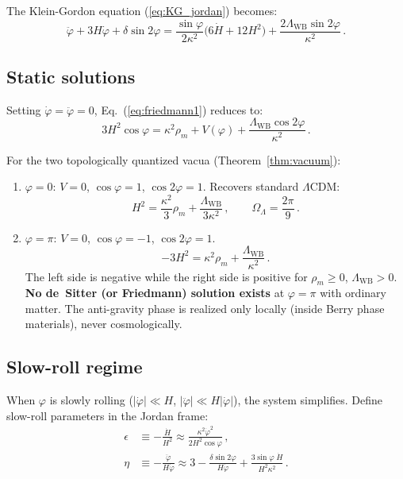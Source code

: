 \documentclass[aps,prd,twocolumn,superscriptaddress,nofootinbib]{revtex4-2}
\newcommand{\Lw}{\Lambda_{\mathrm{WB}}}
\begin{document}
The Klein-Gordon equation (\ref{eq:KG_jordan}) becomes:
\begin{equation}
  \ddot\varphi + 3H\dot\varphi + \delta\sin 2\varphi
  = \frac{\sin\varphi}{2\kappa^2}
  \bigl(6\dot{H} + 12H^2\bigr)
  + \frac{2\Lw\sin 2\varphi}{\kappa^2}\,.
  \label{eq:KG_cosmo}
\end{equation}

\subsection{Static solutions}

Setting $\dot\varphi = \ddot\varphi = 0$,
Eq.~(\ref{eq:friedmann1}) reduces to:
\begin{equation}
  3H^2\cos\varphi = \kappa^2\rho_m + V(\varphi)
  + \frac{\Lw\cos 2\varphi}{\kappa^2}\,.
\end{equation}

For the two topologically quantized vacua
(Theorem~\ref{thm:vacuum}):
\begin{enumerate}
\item $\varphi = 0$:
  $V = 0$, $\cos\varphi = 1$, $\cos 2\varphi = 1$.
  Recovers standard $\Lambda$CDM:
  \begin{equation}
    H^2 = \frac{\kappa^2}{3}\rho_m + \frac{\Lw}{3\kappa^2}\,,
    \qquad \Omega_\Lambda = \frac{2\pi}{9}\,.
  \end{equation}

\item $\varphi = \pi$:
  $V = 0$, $\cos\varphi = -1$, $\cos 2\varphi = 1$.
  \begin{equation}
    -3H^2 = \kappa^2\rho_m + \frac{\Lw}{\kappa^2}\,.
    \label{eq:anti_gravity_friedmann}
  \end{equation}
  The left side is negative while the right side is positive
  for $\rho_m \geq 0$, $\Lw > 0$.
  \textbf{No de~Sitter (or Friedmann) solution exists}
  at $\varphi = \pi$ with ordinary matter.
  The anti-gravity phase is realized only locally
  (inside Berry phase materials), never cosmologically.
\end{enumerate}

\subsection{Slow-roll regime}

When $\varphi$ is slowly rolling ($|\dot\varphi| \ll H$,
$|\ddot\varphi| \ll H|\dot\varphi|$), the system simplifies.
Define slow-roll parameters in the Jordan frame:
\begin{align}
  \epsilon &\equiv -\frac{\dot{H}}{H^2}
  \approx \frac{\kappa^2\dot\varphi^2}{2H^2\cos\varphi}\,,
  \\
  \eta &\equiv -\frac{\ddot\varphi}{H\dot\varphi}
  \approx 3 - \frac{\delta\sin 2\varphi}{H\dot\varphi}
  + \frac{3\sin\varphi\;\dot{H}}{H^2\kappa^2}\,.
\end{align}
\end{document}
